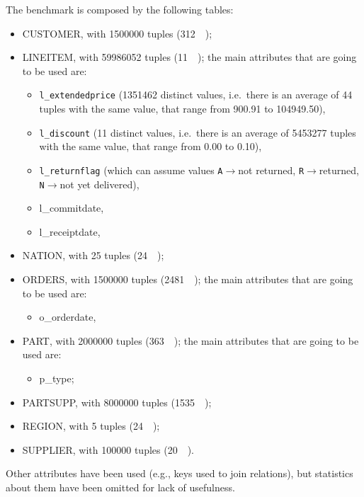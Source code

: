The benchmark is composed by the following tables:
\begin{itemize}
	\item CUSTOMER, with \num{1500000} tuples (\SI{312}{\mega\byte});
	\item LINEITEM, with \num{59986052} tuples (\SI{11}{\giga\byte}); the main attributes that are going to be used are:
		\begin{itemize}
			\item \texttt{l\_extendedprice} (\num{1351462} distinct values, i.e.\ there is an average of \num{44} tuples with the same value, that range from \num{900.91} to \num{104949.50}),
			\item \texttt{l\_discount} (\num{11} distinct values, i.e.\ there is an average of \num{5453277} tuples with the same value, that range from \num{0.00} to \num{0.10}),
			\item \texttt{l\_returnflag} (which can assume values \texttt{A}$\rightarrow$not returned, \texttt{R}$\rightarrow$returned, \texttt{N}$\rightarrow$not yet delivered),
			\item l\_commitdate,
			\item l\_receiptdate,
		\end{itemize}
	\item NATION, with \num{25} tuples (\SI{24}{\kilo\byte});
	\item ORDERS, with \num{1500000} tuples (\SI{2481}{\kilo\byte}); the main attributes that are going to be used are:
		\begin{itemize}
			\item o\_orderdate,
		\end{itemize}
	\item PART, with \num{2000000} tuples (\SI{363}{\mega\byte}); the main attributes that are going to be used are:
		\begin{itemize}
			\item p\_type;
		\end{itemize}
	\item PARTSUPP, with \num{8000000} tuples (\SI{1535}{\mega\byte});
	\item REGION, with \num{5} tuples (\SI{24}{\kilo\byte});
	\item SUPPLIER, with \num{100000} tuples (\SI{20}{\mega\byte}).
\end{itemize}

Other attributes have been used (e.g., keys used to join relations), but statistics about them have been omitted for lack of usefulness.